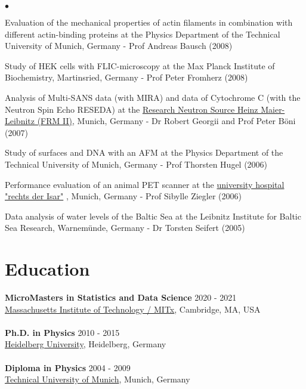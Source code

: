 \documentclass[margin,line]{res}
\newenvironment{list2}{
  \begin{list}{$\bullet$}{%
      \setlength{\itemsep}{0in}
      \setlength{\parsep}{0in} \setlength{\parskip}{0in}
      \setlength{\topsep}{0in} \setlength{\partopsep}{0in} 
      \setlength{\leftmargin}{0.2in}}}{\end{list}}
\begin{document}
\begin{resume}
\vspace*{-2mm}
\begin{list2}
\vspace*{-1mm}
\item Evaluation of the mechanical properties of actin filaments in combination with different actin-binding proteins at the Physics Department of the Technical University of Munich, Germany - Prof Andreas Bausch (2008)
\item Study of HEK cells with FLIC-microscopy at the Max Planck Institute of Biochemistry, Martinsried, Germany - Prof Peter Fromherz (2008)
\item Analysis of Multi-SANS data (with MIRA) and data of Cytochrome C (with the Neutron Spin Echo RESEDA) at the  \href{https://www.frm2.tum.de/en/home/}{Research Neutron Source Heinz Maier-Leibnitz (FRM II)}, Munich, Germany - Dr Robert Georgii and Prof Peter Böni (2007)
\item Study of surfaces and DNA with an AFM at the Physics Department of the Technical University of Munich, Germany - Prof Thorsten Hugel (2006)
\item Performance evaluation of an animal PET scanner at the  \href{https://www.mri.tum.de/}{university hospital "rechts der Isar"} , Munich, Germany - Prof Sibylle Ziegler (2006)
\item Data analysis of water levels of the Baltic Sea at the Leibnitz Institute for Baltic Sea Research, Warnemünde, Germany - Dr Torsten Seifert (2005)
\end{list2}


\section{\sc Education}
{\bf MicroMasters in Statistics and Data Science} \hfill {2020 - 2021}\\
\href{https://micromasters.mit.edu/ds/}{Massachusetts Institute of Technology / MITx}, Cambridge, MA, USA\\
\vspace*{-3mm}\\
{\bf Ph.D. in Physics} \hfill {2010 - 2015}\\
\href{https://www.uni-heidelberg.de/en}{Heidelberg University}, Heidelberg, Germany\\
\vspace*{-3mm}\\
{\bf Diploma in Physics} \hfill {2004 - 2009}\\
\href{https://www.tum.de/en/}{Technical University of Munich}, Munich, Germany


\end{resume}
\end{document}
